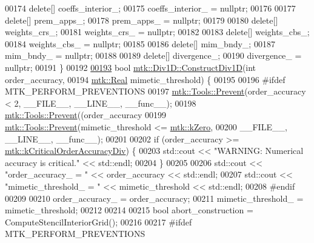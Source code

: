 \begin{DoxyCode}
00174   \textcolor{keyword}{delete}[] coeffs\_interior\_;
00175   coeffs\_interior\_ = \textcolor{keyword}{nullptr};
00176 
00177   \textcolor{keyword}{delete}[] prem\_apps\_;
00178   prem\_apps\_ = \textcolor{keyword}{nullptr};
00179 
00180   \textcolor{keyword}{delete}[] weights\_crs\_;
00181   weights\_crs\_ = \textcolor{keyword}{nullptr};
00182 
00183   \textcolor{keyword}{delete}[] weights\_cbs\_;
00184   weights\_cbs\_ = \textcolor{keyword}{nullptr};
00185 
00186   \textcolor{keyword}{delete}[] mim\_bndy\_;
00187   mim\_bndy\_ = \textcolor{keyword}{nullptr};
00188 
00189   \textcolor{keyword}{delete}[] divergence\_;
00190   divergence\_ = \textcolor{keyword}{nullptr};
00191 \}
00192 
\hypertarget{mtk__div__1d_8cc_source_l00193}{}\hyperlink{classmtk_1_1Div1D_a52fcd1542f11e606e36bd188e48bfdf7}{00193} \textcolor{keywordtype}{bool} \hyperlink{classmtk_1_1Div1D_a52fcd1542f11e606e36bd188e48bfdf7}{mtk::Div1D::ConstructDiv1D}(\textcolor{keywordtype}{int} order\_accuracy,
00194                                 \hyperlink{group__c01-roots_gac080bbbf5cbb5502c9f00405f894857d}{mtk::Real} mimetic\_threshold) \{
00195 
00196 \textcolor{preprocessor}{  #ifdef MTK\_PERFORM\_PREVENTIONS}
00197   \hyperlink{classmtk_1_1Tools_a332324c6f25e66be9dff48c5987a3b9f}{mtk::Tools::Prevent}(order\_accuracy < 2, \_\_FILE\_\_, \_\_LINE\_\_, \_\_func\_\_);
00198   \hyperlink{classmtk_1_1Tools_a332324c6f25e66be9dff48c5987a3b9f}{mtk::Tools::Prevent}((order\_accuracy%
00199   \hyperlink{classmtk_1_1Tools_a332324c6f25e66be9dff48c5987a3b9f}{mtk::Tools::Prevent}(mimetic\_threshold <= \hyperlink{group__c01-roots_ga59a451a5fae30d59649bcda274fea271}{mtk::kZero},
00200                       \_\_FILE\_\_, \_\_LINE\_\_, \_\_func\_\_);
00201 
00202   \textcolor{keywordflow}{if} (order\_accuracy >= \hyperlink{group__c01-roots_ga0898eef2108473e44a5223932d571c31}{mtk::kCriticalOrderAccuracyDiv}) \{
00203     std::cout << \textcolor{stringliteral}{"WARNING: Numerical accuracy is critical."} << std::endl;
00204   \}
00205 
00206   std::cout << \textcolor{stringliteral}{"order\_accuracy\_ = "} << order\_accuracy << std::endl;
00207   std::cout << \textcolor{stringliteral}{"mimetic\_threshold\_ = "} << mimetic\_threshold << std::endl;
00208 \textcolor{preprocessor}{  #endif}
00209 
00210   order\_accuracy\_ = order\_accuracy;
00211   mimetic\_threshold\_ = mimetic\_threshold;
00212 
00214 
00215   \textcolor{keywordtype}{bool} abort\_construction = ComputeStencilInteriorGrid();
00216 
00217 \textcolor{preprocessor}{  #ifdef MTK\_PERFORM\_PREVENTIONS}

\end{DoxyCode}
